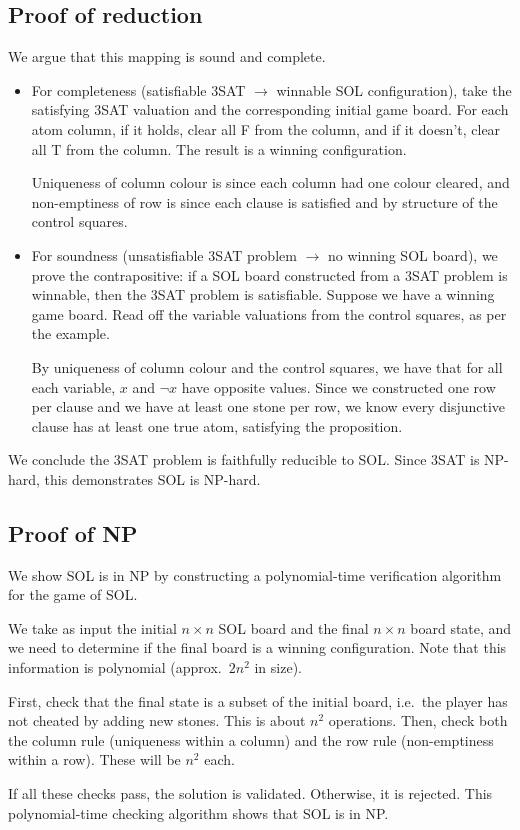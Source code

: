 \documentclass[a4paper]{article}
\begin{document}
\subsection*{Proof of reduction}
We argue that this mapping is sound and complete.
\begin{itemize}
  \item For completeness (satisfiable 3SAT $\longrightarrow$ winnable SOL configuration),
    take the satisfying 3SAT valuation and the corresponding
    initial game board.
    For each atom column, if it holds, clear all F from the column, and if it doesn't, clear all T from the column.
    The result is a winning configuration.

    Uniqueness of column colour is since each column had one colour cleared,
    and non-emptiness of row is since each clause is satisfied and by structure
    of the control squares.

  \item For soundness
    (unsatisfiable 3SAT problem $\longrightarrow$ no winning SOL board),
    we prove the contrapositive:
    if a SOL board constructed from a 3SAT problem is winnable, then 
    the 3SAT problem is satisfiable. 
    Suppose we have a winning game board.
    Read off the variable valuations from the control squares,
    as per the example.

    By uniqueness of column colour and the control squares, we have 
    that for all each variable, $x$ and $\neg x$ have opposite values.
    Since we constructed one row per clause and 
    we have at least one stone per row,
    we know every disjunctive clause has at least one true atom,
    satisfying the proposition.

\end{itemize}
We conclude the 3SAT problem is faithfully reducible to SOL.
Since 3SAT is NP-hard, this demonstrates SOL is NP-hard.

\subsection*{Proof of NP}
We show SOL is in NP by constructing a polynomial-time verification algorithm
for the game of SOL.

We take as input the initial $n\times n$ SOL board and the final
$n \times n$ board state,
and we need to determine if the final board is a winning configuration. Note
that this information is polynomial (approx.\ $2n^2$ in size).

First, check that the final state is a subset of the initial board,
i.e.\ the player has not cheated by adding new stones.
This is about $n^2$ operations.
Then, check both the column rule (uniqueness within a column)
and the row rule (non-emptiness within a row).
These will be $n^2$ each.

If all these checks pass, the solution is validated.
Otherwise, it is rejected.
This polynomial-time checking algorithm shows that SOL is in NP. 
\end{document}
